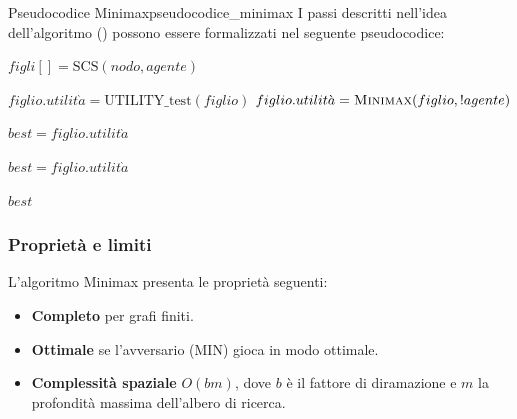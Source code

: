 \begin{definizione}{Pseudocodice Minimax}{pseudocodice_minimax}
    I passi descritti nell'idea dell'algoritmo ()
    possono essere formalizzati nel seguente pseudocodice:
    \begin{algorithm}[H]
        \caption{Pseudocodice algoritmo Minimax}
        \begin{algorithmic}[1]
                \State $figli[] = \text{SCS}(nodo, agente)$
                
                 
                        \State $figlio.utilit\grave{a} = \text{UTILITY\_test}(figlio)$
                    \Else
                        \State $figlio.utilit\grave{a} = \textsc{Minimax}(figlio, !agente)$
                    \EndIf
                    
                    \Statex
                    
                        \State $best = figlio.utilit\grave{a}$
                    \EndIf
                    
                        \State $best = figlio.utilit\grave{a}$
                    \EndIf
                \EndFor
                
                \State \Return $best$
            \EndFunction
            \end{algorithmic}
        \end{algorithm}
\end{definizione}

\subsubsection{Proprietà e limiti}
L'algoritmo Minimax presenta le proprietà seguenti:
\begin{itemize}
    \item \textbf{Completo} per grafi finiti.
    \item \textbf{Ottimale} se l'avversario (MIN) gioca in modo ottimale.
    \item \textbf{Complessità spaziale} $O(bm)$, dove $b$ è il fattore di
    diramazione e $m$ la profondità massima dell'albero di ricerca.
\end{itemize}

